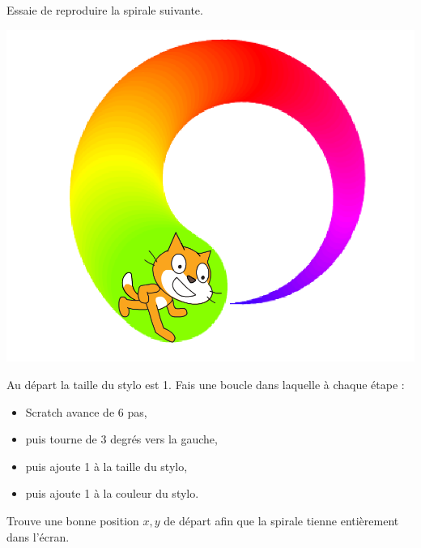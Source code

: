 \documentclass[class=report,crop=false, 12pt]{standalone}
\begin{document}




\bigskip
\bigskip


\begin{activite}

Essaie de reproduire la spirale suivante.

\begin{center}
  \includegraphics[scale=\scaleecran,scale=1.1]{ecran-03-ex1}   
\end{center}

Au départ la taille du stylo est 1.
Fais une boucle dans laquelle à chaque étape :
\begin{itemize}
  \item Scratch avance de 6 pas,
  \item puis tourne de 3 degrés vers la gauche,
  \item puis ajoute 1 à la taille du stylo,
  \item puis ajoute 1 à la couleur du stylo.
\end{itemize}


Trouve une bonne position $x,y$ de départ afin que la spirale tienne entièrement dans l'écran.



%  
%  
%  

\end{activite}
\end{document}
